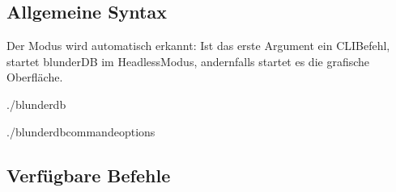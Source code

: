 \documentclass[letterpaper,10pt,german]{sphinxmanual}
\begin{document}
\subsection{Allgemeine Syntax}
\label{\detokenize{cli:syntaxe-generale}}
\sphinxAtStartPar
Der Modus wird automatisch erkannt: Ist das erste Argument ein CLI\sphinxhyphen{}Befehl, startet blunderDB im Headless\sphinxhyphen{}Modus, andernfalls startet es die grafische Oberfläche.

\begin{sphinxVerbatim}[commandchars=\\\{\}]
./blunderdb

./blunderdb\PYGZlt{}commande\PYGZgt{}\PYG{o}{[}options\PYG{o}{]}
\end{sphinxVerbatim}


\subsection{Verfügbare Befehle}
\label{\detokenize{cli:commandes-disponibles}}
\end{document}
